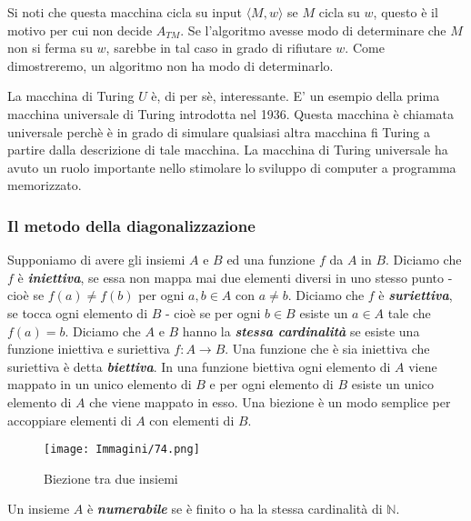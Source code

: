 \documentclass{article}
\begin{document}
Si noti che questa macchina cicla su input $\langle M,w \rangle$ se $M$ cicla su $w$, questo è il motivo per cui non decide $A_{TM}$.
Se l'algoritmo avesse modo di determinare che $M$ non si ferma su $w$, sarebbe in tal caso in grado di rifiutare $w$.
Come dimostreremo, un algoritmo non ha modo di determinarlo.

La macchina di Turing $U$ è, di per sè, interessante.
E' un esempio della prima macchina universale di Turing introdotta nel 1936.
Questa macchina è chiamata universale perchè è in grado di simulare qualsiasi altra macchina fi Turing a partire dalla descrizione di tale macchina.
La macchina di Turing universale ha avuto un ruolo importante nello stimolare lo sviluppo di computer a programma memorizzato.

\subsubsection{Il metodo della diagonalizzazione}

\begin{tcolorbox}[title=Definizione 4.12]
\label{definizione-4.12}
Supponiamo di avere gli insiemi $A$ e $B$ ed una funzione $f$ da $A$ in $B$.
Diciamo che $f$ è \textbf{\textit{iniettiva}}, se essa non mappa mai due elementi diversi in uno stesso punto - cioè se $f(a) \neq f(b)$ per ogni $a,b \in A$ con $a \neq b$.
Diciamo che $f$ è \textbf{\textit{suriettiva}}, se tocca ogni elemento di $B$ - cioè se per ogni $b \in B$ esiste un $a \in A$ tale che $f(a) = b$.
Diciamo che $A$ e $B$ hanno la \textbf{\textit{stessa cardinalità}} se esiste una funzione iniettiva e suriettiva $f : A \rightarrow B$.
Una funzione che è sia iniettiva che suriettiva è detta \textbf{\textit{biettiva}}.
In una funzione biettiva ogni elemento di $A$ viene mappato in un unico elemento di $B$ e per ogni elemento di $B$ esiste un unico elemento di $A$ che viene mappato in esso.
Una biezione è un modo semplice per accoppiare elementi di $A$ con elementi di $B$.
\end{tcolorbox}

\begin{figure}[H]
    \centering
    \texttt{[image: Immagini/74.png]}
    \caption{Biezione tra due insiemi}
    \label{figura-4.13}
\end{figure}

\begin{tcolorbox}[title=Definizione 4.14]
    Un insieme $A$ è \textbf{\textit{numerabile}} se è finito o ha la stessa cardinalità di $\mathbb{N}$.    
\end{tcolorbox}
\end{document}
